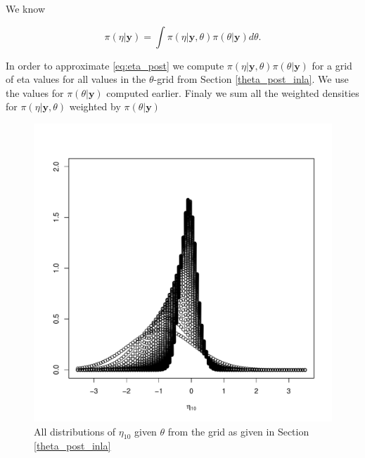 We know 

\begin{equation}
\label{eq:eta_post}
    \pi(\eta|\boldsymbol{y}) = \int \pi(\eta|\boldsymbol{y}, \theta) \pi(\theta|\boldsymbol{y}) d\theta.
\end{equation}

In order to approximate \eqref{eq:eta_post} we compute $\pi(\eta|\boldsymbol{y}, \theta) \pi(\theta|\boldsymbol{y})$ for a grid of eta values for all values in the $\theta$-grid from Section \ref{theta_post_inla}. We use the values for $\pi(\theta|\boldsymbol{y})$ computed earlier. Finaly we sum all the weighted densities for $\pi(\eta|\boldsymbol{y}, \theta)$ weighted by $\pi(\theta|\boldsymbol{y})$







\begin{figure}
    \centering
    \includegraphics[width=\textwidth]{Images/eta_10.pdf}
    \caption{All distributions of $\eta_{10}$ given $\theta$ from the grid as given in Section \ref{theta_post_inla}}
    \label{fig:eta_all}
\end{figure}


